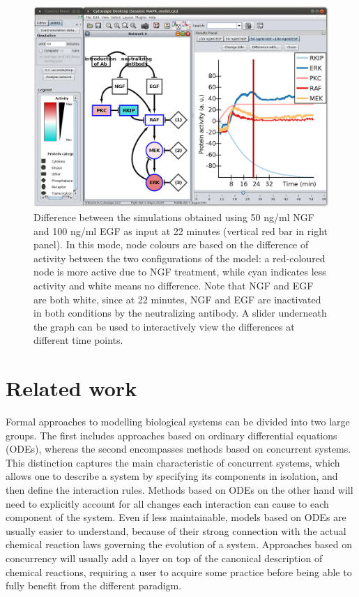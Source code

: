 \documentclass[journal, 10pt]{IEEEtran}
\begin{document}
\begin{figure}[htb]
\centering
  \includegraphics[width=.48\textwidth]{mapk_model_diff}
\caption{Difference between the simulations obtained using
50 ng/ml NGF and 100 ng/ml EGF as input at 22 minutes (vertical red bar in right panel). In this mode, node colours
are based on the difference of activity between the two configurations of the model:
a red-coloured node is more active due to NGF treatment, while cyan indicates less activity and white
means no difference. Note that NGF and EGF are both white, since at 22 minutes, 
NGF and EGF are inactivated in both conditions by the neutralizing antibody. A slider underneath the graph can be used to 
interactively view the differences at different time points. \label{fig:case-study-diff}}
\end{figure}




\section{Related work}\label{sec:related-work}
Formal approaches to modelling biological systems can be divided into two large groups. The first 
includes approaches based on ordinary differential equations (ODEs), whereas the second 
encompasses methods based on concurrent systems. This distinction captures the main
characteristic of concurrent systems, which allows one to describe a system by specifying its
components in isolation, and then define the interaction rules. Methods based on ODEs on the other 
hand will need to explicitly account for all changes each interaction can cause to each component of the system.
Even if less maintainable, models based on ODEs are usually easier to understand, because of their strong
connection with the actual chemical reaction laws governing the evolution of a system. Approaches based 
on concurrency will usually add a layer on top of the canonical description of chemical reactions, 
requiring a user to acquire some practice before being able to fully benefit from the different paradigm.
\end{document}
